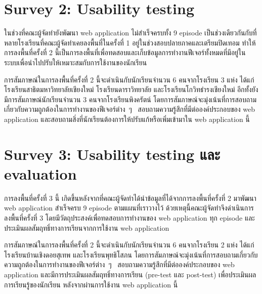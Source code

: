 \section{Survey 2: Usability testing}
ในช่วงที่คณะผู้จัดทำยังพัฒนา web application ไม่สำเร็จครบทั้ง 9 episode เป็นช่วงเดียวกันกับที่หลายโรงเรียนที่คณะผู้จัดทำเคยลงพื้นที่ในครั้งที่ 1 อยู่ในช่วงสอบปลายภาคและเตรียมปิดเทอม 
ทำให้การลงพื้นที่ครั้งที่ 2 นี้เป็นการลงพื้นที่เพื่อทดสอบและเก็บข้อมูลการทำงานฟีเจอร์ทั้งหมดที่มีอยู่ในระบบเพื่อนำไปปรับให้เหมาะสมกับการใช้งานของนักเรียน

การสัมภาษณ์ในการลงพื้นที่ครั้งที่ 2 นี้จะดำเนินกับนักเรียนจำนวน 6 คนจากโรงเรียน 3 แห่ง ได้แก่ โรงเรียนสาธิตมหาวิทยาลัยเชียงใหม่ โรงเรียนดาราวิทยาลัย และโรงเรียนโกวิทธํารงเชียงใหม่ 
อีกทั้งยังมีการสัมภาษณ์นักเรียนจำนวน 3 คนจากโรงเรียนพิงครัตน์ โดยการสัมภาษณ์จะมุ่งเน้นที่การสอบถามเกี่ยวกับความถูกต้องในการทำงานของฟีเจอร์ต่าง~ๆ~ 
สอบถามความรู้สึกที่มีต่อองค์ประกอบของ web application และสอบถามสิ่งที่นักเรียนต้องการให้ปรับแก้หรือเพิ่มเข้ามาใน web application นี้

\section{Survey 3: Usability testing และ evaluation}
การลงพื้นที่ครั้งที่ 3 นี้ เกิดขึ้นหลังจากที่คณะผู้จัดทำได้นำข้อมูลที่ได้จากการลงพื้นที่ครั้งที่ 2 มาพัฒนา web application สำเร็จครบ 9 episode ตามแผนที่เราวางไว้ 
ด้วยเหตุนี้คณะผู้จัดทำจึงดำเนินการลงพื้นที่ครั้งที่ 3 โดยมีวัตถุประสงค์เพื่อทดสอบการทำงานของ web application ทุก episode และ ประเมินผลสัมฤทธิ์ทางการเรียนจากการใช้งาน web application

การสัมภาษณ์ในการลงพื้นที่ครั้งที่ 2 นี้จะดำเนินกับนักเรียนจำนวน 6 คนจากโรงเรียน 2 แห่ง ได้แก่ โรงเรียนบ้านเชิงดอยสุเทพ และโรงเรียนพุทธิโสภน 
โดยการสัมภาษณ์จะมุ่งเน้นที่การสอบถามเกี่ยวกับความถูกต้องในการทำงานของฟีเจอร์ต่าง~ๆ~ 
สอบถามความรู้สึกที่มีต่อองค์ประกอบของ web application และมีการประเมินผลสัมฤทธิ์ทางการเรียน (pre-test และ post-test) เพื่อประเมินผลการเรียนรู้ของนักเรียน
หลังจากผ่านการใช้งาน web application นี้